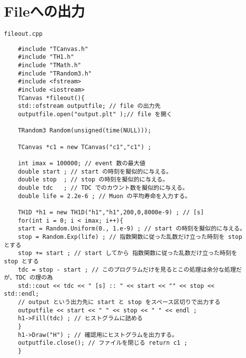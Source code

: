   \clearpage
 \section{Fileへの出力}

 \begin{itembox}{\texttt{fileout.cpp}}
\begin{verbatim}
	#include "TCanvas.h"
	#include "TH1.h"
	#include "TMath.h"
	#include "TRandom3.h"
	#include <fstream>
	#include <iostream>
	TCanvas *fileout(){
	std::ofstream outputfile; // file の出力先
	outputfile.open("output.plt" );// file を開く

	TRandom3 Random(unsigned(time(NULL)));

	TCanvas *c1 = new TCanvas("c1","c1") ;

	int imax = 100000; // event 数の最大値
	double start ; // start の時刻を擬似的に与える。 
	double stop  ; // stop の時刻を擬似的に与える。 
	double tdc   ; // TDC でのカウント数を擬似的に与える。
	double life = 2.2e-6 ; // Muon の平均寿命を入力する。

	TH1D *h1 = new TH1D("h1","h1",200,0,8000e-9) ; // [s]
	for(int i = 0; i < imax; i++){
	start = Random.Uniform(0., 1.e-9) ; // start の時刻を擬似的に与える。
	stop = Random.Exp(life) ; // 指数関数に従った乱数だけ立った時刻を stop とする
	stop += start ; // start してから 指数関数に従った乱数だけ立った時刻を stop とする
	tdc = stop - start ; // このプログラムだけを見るとこの処理は余分な処理だが、TDC の理の為
	std::cout << tdc << " [s] :: " << start << "" << stop << std::endl;
	// output という出力先に start と stop をスペース区切りで出力する
	outputfile << start << " " << stop << " " << endl ;
	h1->Fill(tdc) ; // ヒストグラムに詰める
	}
	h1->Draw("H") ; // 確認用にヒストグラムを出力する。
	outputfile.close(); // ファイルを閉じる return c1 ;
	}

\end{verbatim}
 \end{itembox}

